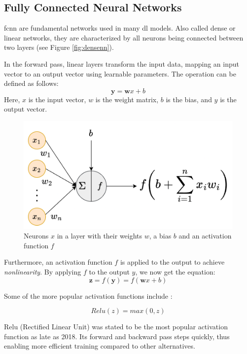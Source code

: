 \subsection{Fully Connected Neural Networks}
\label{back:linear}

\acrfull{fcnn} are fundamental networks used in many \acrshort{dl} models. Also called dense or linear networks, they are characterized by all neurons being connected between two layers (see Figure \ref{fig:densenn}). 

In the forward pass, linear layers transform the input data, mapping an input vector to an output vector using learnable parameters. The operation can be defined as follows:
\begin{equation}\label{f:wxb}
    \mathbf{y} = \mathbf{w}x+b
\end{equation}
Here, $x$ is the input vector, \textbf{$w$} is the weight matrix, $b$ is the bias, and \textbf{$y$} is the output vector.

\begin{figure}[!h]
    \centering
    \includegraphics[width=0.7\linewidth]{figures/dl.png}
    \caption{Neurons $x$ in a layer with their weights $w$, a bias $b$ and an activation function $f$}
    \label{fig:dl}
\end{figure}

Furthermore, an activation function $f$ is applied to the output to achieve \textit{nonlinearity}. By applying $f$ to the output $y$, we now get the equation:
\begin{equation}\label{f:fwxb}
    \mathbf{z} = f(\mathbf{y}) = f(\mathbf{w}x+b)
\end{equation}

Some of the more popular activation functions include \cite{szandala2021review}: 

\begin{equation}
    Relu(z) = max(0, z)
\end{equation}

Relu (Rectified Linear Unit) was stated to be the most popular activation function as late as 2018. Its forward and backward pass steps quickly, thus enabling more efficient training compared to other alternatives.

